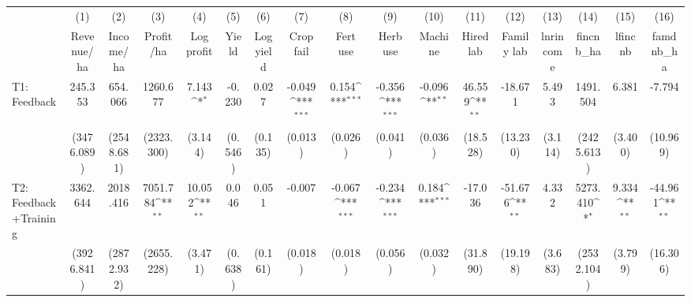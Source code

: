 {
\def\sym#1{\ifmmode^{#1}\else\(^{#1}\)\fi}
\begin{tabular}{l*{16}{c}}
\toprule
                    &\multicolumn{1}{c}{(1)}&\multicolumn{1}{c}{(2)}&\multicolumn{1}{c}{(3)}&\multicolumn{1}{c}{(4)}&\multicolumn{1}{c}{(5)}&\multicolumn{1}{c}{(6)}&\multicolumn{1}{c}{(7)}&\multicolumn{1}{c}{(8)}&\multicolumn{1}{c}{(9)}&\multicolumn{1}{c}{(10)}&\multicolumn{1}{c}{(11)}&\multicolumn{1}{c}{(12)}&\multicolumn{1}{c}{(13)}&\multicolumn{1}{c}{(14)}&\multicolumn{1}{c}{(15)}&\multicolumn{1}{c}{(16)}\\
                    &\multicolumn{1}{c}{Revenue/ha}&\multicolumn{1}{c}{Income/ha}&\multicolumn{1}{c}{Profit/ha}&\multicolumn{1}{c}{Log profit}&\multicolumn{1}{c}{Yield}&\multicolumn{1}{c}{Log yield}&\multicolumn{1}{c}{Crop fail}&\multicolumn{1}{c}{Fert use}&\multicolumn{1}{c}{Herb use}&\multicolumn{1}{c}{Machine}&\multicolumn{1}{c}{Hired lab}&\multicolumn{1}{c}{Family lab}&\multicolumn{1}{c}{lnrincome}&\multicolumn{1}{c}{fincnb\_ha}&\multicolumn{1}{c}{lfincnb}&\multicolumn{1}{c}{famdnb\_ha}\\
\midrule
T1: Feedback        &     245.353         &     654.066         &    1260.677         &       7.143\sym{*}  &      -0.230         &       0.027         &      -0.049\sym{***}&       0.154\sym{***}&      -0.356\sym{***}&      -0.096\sym{**} &      46.559\sym{**} &     -18.671         &       5.493         &    1491.504         &       6.381         &      -7.794         \\
                    &  (3476.089)         &  (2548.681)         &  (2323.300)         &     (3.144)         &     (0.546)         &     (0.135)         &     (0.013)         &     (0.026)         &     (0.041)         &     (0.036)         &    (18.528)         &    (13.230)         &     (3.114)         &  (2425.613)         &     (3.400)         &    (10.969)         \\
T2: Feedback+Training&    3362.644         &    2018.416         &    7051.784\sym{**} &      10.052\sym{**} &       0.046         &       0.051         &      -0.007         &      -0.067\sym{***}&      -0.234\sym{***}&       0.184\sym{***}&     -17.036         &     -51.676\sym{**} &       4.332         &    5273.410\sym{*}  &       9.334\sym{**} &     -44.961\sym{**} \\
                    &  (3926.841)         &  (2872.932)         &  (2655.228)         &     (3.471)         &     (0.638)         &     (0.161)         &     (0.018)         &     (0.018)         &     (0.056)         &     (0.032)         &    (31.890)         &    (19.198)         &     (3.683)         &  (2532.104)         &     (3.799)         &    (16.306)         \\

\end{tabular}}
